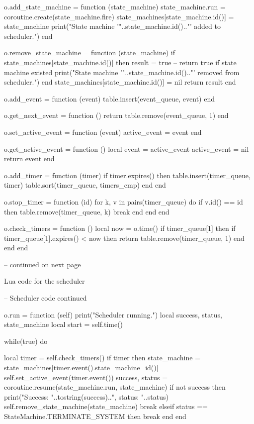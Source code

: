 \begin{appendices}
\begin{listing}[H]
\begin{luacode}
	o.add_state_machine = function (state_machine)
		state_machine.run = coroutine.create(state_machine.fire)
		state_machines[state_machine.id()] = state_machine
		print("State machine '"..state_machine.id().."' added to scheduler.")
	end

	o.remove_state_machine = function (state_machine)
		if state_machines[state_machine.id()] then
			result = true -- return true if state machine existed
			print("State machine '"..state_machine.id().."' removed from scheduler.")
		end
		state_machines[state_machine.id()] = nil
		return result
	end

	o.add_event = function (event)
		table.insert(event_queue, event)
	end

	o.get_next_event = function ()
		return table.remove(event_queue, 1)
	end

	o.set_active_event = function (event)
		active_event = event
	end

	o.get_active_event = function ()
		local event = active_event
		active_event = nil
		return event
	end

	o.add_timer = function (timer)
		if timer.expires() then
			table.insert(timer_queue, timer)
			table.sort(timer_queue, timers_cmp)
		end
	end

	o.stop_timer = function (id)
		for k, v in pairs(timer_queue) do
			if v.id() == id then
				table.remove(timer_queue, k)
				break
			end
		end
	end

	o.check_timers = function ()
		local now = o.time()
		if timer_queue[1] then
			if timer_queue[1].expires() < now then return table.remove(timer_queue, 1) end
		end
	end

-- continued on next page
\end{luacode}
	\label{code:scheduler}
	\caption{Lua code for the scheduler }
\end{listing}

\begin{listing}[H]
\begin{luacode}
-- Scheduler code continued

	o.run = function (self)
		print("Scheduler running.")
		local success, status, state_machine
		local start = self.time()

		while(true) do

			local timer = self.check_timers()
			if timer then
				state_machine = state_machines[timer.event().state_machine_id()]
				self.set_active_event(timer.event())
				success, status = coroutine.resume(state_machine.run, state_machine)
				if not success then
					print("Success: "..tostring(success)..", status: "..status)
					self.remove_state_machine(state_machine)
					break
				elseif status == StateMachine.TERMINATE_SYSTEM then
					break
				end
			end


\end{luacode}
\end{listing}
\end{appendices}
